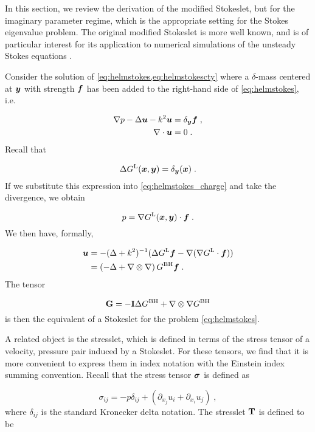 In this section, we review the derivation of the
modified Stokeslet, but for the imaginary parameter
regime, which is the appropriate setting for the Stokes
eigenvalue problem.
The original modified Stokeslet is more well known,
and is of particular interest for its application to
numerical simulations of the unsteady Stokes equations
\cite{pozrikidis1992boundary,biros2002embedded}.

 Consider the solution of
\cref{eq:helmstokes,eq:helmstokescty} where a $\delta$-mass
centered at ${\boldsymbol y}$ with strength ${\boldsymbol f}$
has been added to the right-hand side of \cref{eq:helmstokes}, i.e.

\begin{align}
  \nabla p - \Delta {\boldsymbol u} - k^2 {\boldsymbol u} &= \delta_{\boldsymbol y} {\boldsymbol f} \; ,
  \label{eq:helmstokes_charge} \\
  \nabla \cdot {\boldsymbol u} &= 0 \; .
\end{align}
Recall that

\begin{equation}
  \Delta G^{\textrm{L}}({\boldsymbol x},{\boldsymbol y}) = \delta_{\boldsymbol y}({\boldsymbol x}) \; .
\end{equation}
If we substitute this expression into
\eqref{eq:helmstokes_charge} and take the divergence,
we obtain

\begin{equation}
  p = \nabla G^{\textrm{L}}({\boldsymbol x},{\boldsymbol y}) \cdot {\boldsymbol f} \; .
\end{equation}
We then have, formally,

\begin{align}
  {\boldsymbol u} &= - (\Delta + k^2)^{-1} ( \Delta G^{\textrm{L}} {\boldsymbol f}
  - \nabla (\nabla G^{\textrm{L}} \cdot {\boldsymbol f} ) ) \\
  &= \left ( -\Delta + \nabla \otimes \nabla \right )
  G^{\textrm{BH}} {\boldsymbol f} \; .
\end{align}
The tensor

\begin{equation} \label{eq:stokeslet}
  {\bf G} = - {\bf I} \Delta G^{\textrm{BH}} + \nabla \otimes \nabla G^{\textrm{BH}}
\end{equation}
is then the equivalent of a Stokeslet
\cite{pozrikidis1992boundary} for the problem
\eqref{eq:helmstokes}.

A related object is the stresslet, which is defined
in terms of the stress tensor of a velocity, pressure
pair induced by a Stokeslet. For these tensors, we find
that it is more convenient to express them in index notation
with the Einstein index summing convention.
Recall that the stress tensor ${\boldsymbol \sigma}$ is defined as 

\begin{equation}
  \sigma_{ij} = -p \delta_{ij} + \left ( \partial_{x_j}u_i
  +\partial_{x_i} u_j \right ) \; ,
\end{equation}
where $\delta_{ij}$ is the standard Kronecker delta notation.
The stresslet ${\bf T}$ is defined to be

